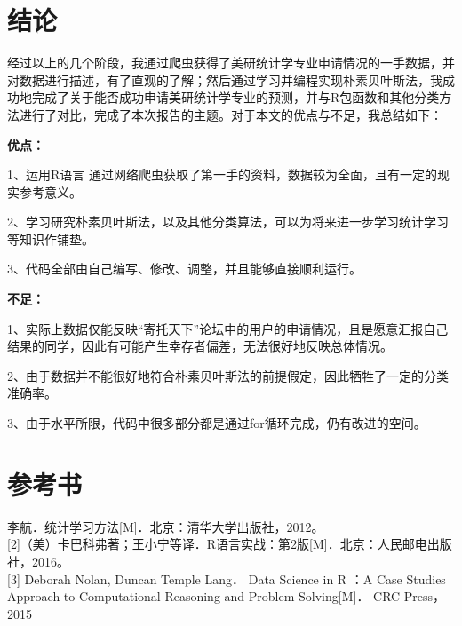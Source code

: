 \documentclass[UTF8,cs4size]{ctexart}
\begin{document}
\section{\heiti 结论}
\par 经过以上的几个阶段，我通过爬虫获得了美研统计学专业申请情况的一手数据，并对数据进行描述，有了直观的了解；然后通过学习并编程实现朴素贝叶斯法，我成功地完成了关于能否成功申请美研统计学专业的预测，并与R包函数和其他分类方法进行了对比，完成了本次报告的主题。对于本文的优点与不足，我总结如下：

\par \noindent \textbf{优点：}
\par 1、运用R语言 通过网络爬虫获取了第一手的资料，数据较为全面，且有一定的现实参考意义。
\par 2、学习研究朴素贝叶斯法，以及其他分类算法，可以为将来进一步学习统计学习等知识作铺垫。
\par 3、代码全部由自己编写、修改、调整，并且能够直接顺利运行。

\par \noindent \textbf{不足：}
\par 1、实际上数据仅能反映“寄托天下”论坛中的用户的申请情况，且是愿意汇报自己结果的同学，因此有可能产生幸存者偏差，无法很好地反映总体情况。
\par 2、由于数据并不能很好地符合朴素贝叶斯法的前提假定，因此牺牲了一定的分类准确率。
\par 3、由于水平所限，代码中很多部分都是通过for循环完成，仍有改进的空间。


\section*{\heiti 参考书}
\noindent
[1] 李航．统计学习方法[M]．北京：清华大学出版社，2012。
\\{} %
[2]（美）卡巴科弗著；王小宁等译．R语言实战：第2版[M]．北京：人民邮电出版社，2016。
\\{}
[3] Deborah Nolan, Duncan Temple Lang． Data Science in R ：A Case Studies Approach to Computational Reasoning and Problem Solving[M]． CRC Press，2015
\end{document}
